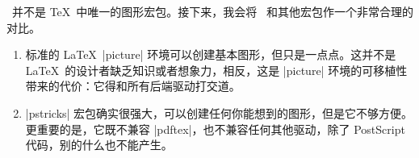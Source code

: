 \begin{onehalfspacing}

\tikzname\ 并不是 \TeX\ 中唯一的图形宏包。接下来，我会将 \tikzname\ 和其他宏包作一个非常合理的对比。
\begin{enumerate}
\item
标准的 \LaTeX\ |{picture}| 环境可以创建基本图形，但只是一点点。这并不是 \LaTeX\ 的设计者缺乏知识或者想象力，相反，这是 |{picture}| 环境的可移植性带来的代价：它得和所有后端驱动打交道。
\item
|pstricks| 宏包确实很强大，可以创建任何你能想到的图形，但是它不够方便。更重要的是，它既不兼容 |pdftex|，也不兼容任何其他驱动，除了 PostScript 代码，别的什么也不能产生。


\end{enumerate}
\end{onehalfspacing}
